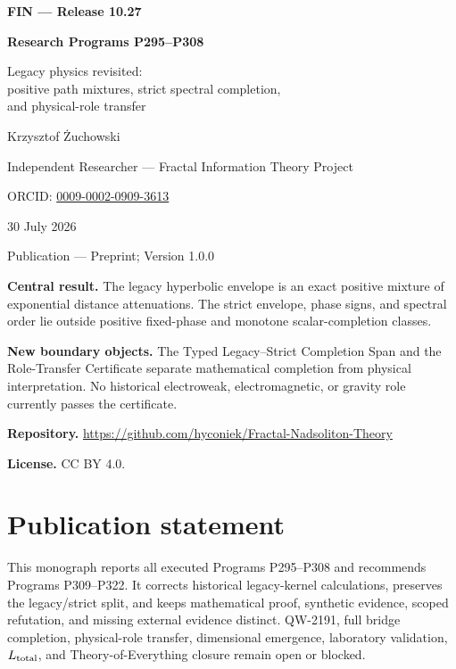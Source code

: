 \documentclass[11pt,a4paper,openany]{report}
\begin{document}
\hypersetup{pageanchor=false}
\begin{titlepage}
\centering
\vspace*{7mm}
{\Large\bfseries FIN --- Release 10.27\par}
\vspace{9mm}
{\Huge\bfseries Research Programs P295--P308\par}
\vspace{6mm}
{\Large Legacy physics revisited:\\
positive path mixtures, strict spectral completion,\\
and physical-role transfer\par}
\vspace{13mm}
{\Large Krzysztof \.Zuchowski\par}
\vspace{2mm}
{\normalsize Independent Researcher --- Fractal Information Theory Project\par}
\vspace{2mm}
{\normalsize ORCID:
\href{https://orcid.org/0009-0002-0909-3613}{0009-0002-0909-3613}\par}
\vspace{7mm}
{\large 30 July 2026\par}
{\normalsize Publication --- Preprint; Version 1.0.0\par}
\vfill
\begin{minipage}{0.92\textwidth}
\small
\textbf{Central result.}
The legacy hyperbolic envelope is an exact positive mixture of exponential
distance attenuations.  The strict envelope, phase signs, and spectral order
lie outside positive fixed-phase and monotone scalar-completion classes.

\medskip
\textbf{New boundary objects.}
The Typed Legacy--Strict Completion Span and the Role-Transfer Certificate
separate mathematical completion from physical interpretation.  No historical
electroweak, electromagnetic, or gravity role currently passes the
certificate.

\medskip
\textbf{Repository.}
\url{https://github.com/hyconiek/Fractal-Nadsoliton-Theory}

\textbf{License.} CC BY 4.0.
\end{minipage}
\vfill
\end{titlepage}
\hypersetup{pageanchor=true}
\chapter*{Publication statement}
This monograph reports all executed Programs P295--P308 and recommends
Programs P309--P322.  It corrects historical legacy-kernel calculations,
preserves the legacy/strict split, and keeps mathematical proof, synthetic
evidence, scoped refutation, and missing external evidence distinct.
QW-2191, full bridge completion, physical-role transfer, dimensional
emergence, laboratory validation, \(L_{\rm total}\), and Theory-of-Everything
closure remain open or blocked.
\end{document}
